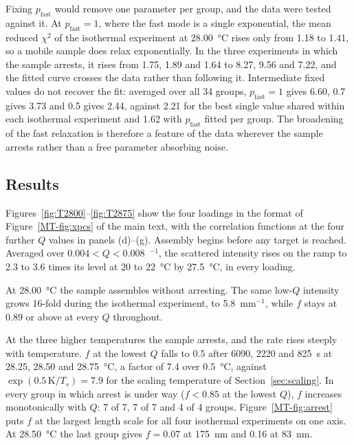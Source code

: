 \documentclass[11pt]{article}
\newcommand{\Ainv}{\text{\AA}$^{-1}$}
\begin{document}
Fixing $p_{\mathrm{fast}}$ would remove one parameter per group, and the data were tested against it. At $p_{\mathrm{fast}}=1$, where the fast mode is a single exponential, the mean reduced $\chi^2$ of the isothermal experiment at \SI{28.00}{\degreeCelsius} rises only from 1.18 to 1.41, so a mobile sample does relax exponentially. In the three experiments in which the sample arrests, it rises from 1.75, 1.89 and 1.64 to 8.27, 9.56 and 7.22, and the fitted curve crosses the data rather than following it. Intermediate fixed values do not recover the fit: averaged over all 34 groups, $p_{\mathrm{fast}}=1$ gives 6.60, 0.7 gives 3.73 and 0.5 gives 2.44, against 2.21 for the best single value shared within each isothermal experiment and 1.62 with $p_{\mathrm{fast}}$ fitted per group. The broadening of the fast relaxation is therefore a feature of the data wherever the sample arrests rather than a free parameter absorbing noise.

\subsection{Results}
Figures~\ref{fig:T2800}--\ref{fig:T2875} show the four loadings in the format of Figure~\ref*{MT-fig:xpcs} of the main text, with the correlation functions at the four further $Q$ values in panels (d)--(g). Assembly begins before any target is reached. Averaged over $0.004<Q<0.008$~\Ainv, the scattered intensity rises on the ramp to 2.3 to 3.6 times its level at 20 to \SI{22}{\degreeCelsius} by \SI{27.5}{\degreeCelsius}, in every loading.

At \SI{28.00}{\degreeCelsius} the sample assembles without arresting. The same low-$Q$ intensity grows 16-fold during the isothermal experiment, to 5.8~mm$^{-1}$, while $f$ stays at 0.89 or above at every $Q$ throughout.

At the three higher temperatures the sample arrests, and the rate rises steeply with temperature. $f$ at the lowest $Q$ falls to 0.5 after 6090, 2220 and \SI{825}{\second} at 28.25, 28.50 and \SI{28.75}{\degreeCelsius}, a factor of 7.4 over \SI{0.5}{\degreeCelsius}, against $\exp(0.5\,\mathrm{K}/T_s)=7.9$ for the scaling temperature of Section~\ref{sec:scaling}. In every group in which arrest is under way ($f<0.85$ at the lowest $Q$), $f$ increases monotonically with $Q$: 7 of 7, 7 of 7 and 4 of 4 groups. Figure~\ref*{MT-fig:arrest} puts $f$ at the largest length scale for all four isothermal experiments on one axis. At \SI{28.50}{\degreeCelsius} the last group gives $f=0.07$ at \SI{175}{\nano\meter} and 0.16 at \SI{83}{\nano\meter}.
\end{document}
